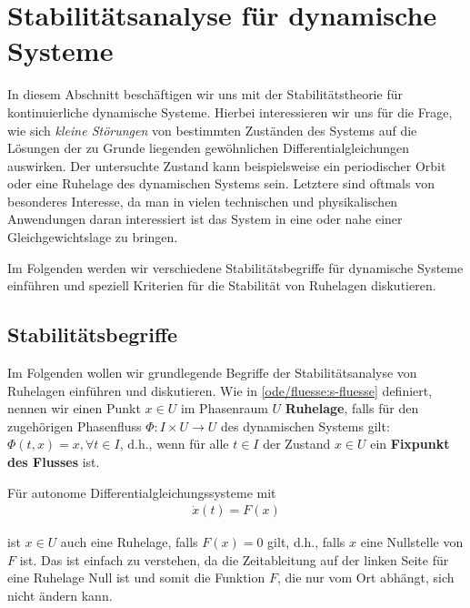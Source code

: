 \documentclass[letterpaper,10pt,german]{jupyterBook}
\begin{document}
\chapter{Stabilitätsanalyse für dynamische Systeme}
\label{\detokenize{odestability/stabilitaetsanalyse:stabilitatsanalyse-fur-dynamische-systeme}}\label{\detokenize{odestability/stabilitaetsanalyse::doc}}
\par
In diesem Abschnitt beschäftigen wir uns mit der Stabilitätstheorie für kontinuierliche dynamische Systeme.
Hierbei interessieren wir uns für die Frage, wie sich \emph{kleine Störungen} von bestimmten Zuständen des Systems auf die Lösungen der zu Grunde liegenden gewöhnlichen Differentialgleichungen auswirken.
Der untersuchte Zustand kann beispielsweise ein periodischer Orbit oder eine Ruhelage des dynamischen Systems sein.
Letztere sind oftmals von besonderes Interesse, da man in vielen technischen und physikalischen Anwendungen daran interessiert ist das System in eine oder nahe einer Gleichgewichtslage zu bringen.

\par
Im Folgenden werden wir verschiedene Stabilitätsbegriffe für dynamische Systeme einführen und speziell Kriterien für die Stabilität von Ruhelagen diskutieren.


\section{Stabilitätsbegriffe}
\label{\detokenize{odestability/stabilitaetsbegriffe:stabilitatsbegriffe}}\label{\detokenize{odestability/stabilitaetsbegriffe::doc}}
\par
Im Folgenden wollen wir grundlegende Begriffe der Stabilitätsanalyse von Ruhelagen einführen und diskutieren.
Wie in \cref{ode/fluesse:s-fluesse}  definiert, nennen wir einen Punkt \(x\in U\) im Phasenraum \(U\) \textbf{Ruhelage}, falls für den zugehörigen Phasenfluss \(\Phi \colon I \times U \rightarrow U\) des dynamischen Systems gilt: \(\Phi(t,x) = x, \forall t \in I\), d.h., wenn für alle \(t \in I\) der Zustand \(x \in U\) ein \textbf{Fixpunkt des Flusses} ist.

\par
Für autonome Differentialgleichungssysteme mit
\begin{align*}
\dot{x}(t) = F(x)
\end{align*}
\par
ist \(x \in U\) auch eine Ruhelage, falls \(F(x) = 0\) gilt, d.h., falls \(x\) eine Nullstelle von \(F\) ist.
Das ist einfach zu verstehen, da die Zeitableitung auf der linken Seite für eine Ruhelage Null ist und somit die Funktion \(F\), die nur vom Ort abhängt, sich nicht ändern kann.
\end{document}
